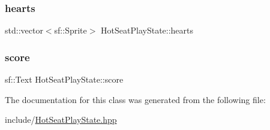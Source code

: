 \subsubsection{\texorpdfstring{hearts}{hearts}}
{\footnotesize\ttfamily std\+::vector$<$sf\+::\+Sprite$>$ Hot\+Seat\+Play\+State\+::hearts\hspace{0.3cm}{\ttfamily [private]}}

\mbox{\label{class_hot_seat_play_state_aa96059a935490b4552002b97fd75667a}} 
\subsubsection{\texorpdfstring{score}{score}}
{\footnotesize\ttfamily sf\+::\+Text Hot\+Seat\+Play\+State\+::score\hspace{0.3cm}{\ttfamily [private]}}



The documentation for this class was generated from the following file\+:\begin{DoxyCompactItemize}
\item 
include/\mbox{\hyperlink{_hot_seat_play_state_8hpp}{Hot\+Seat\+Play\+State.\+hpp}}\end{DoxyCompactItemize}
